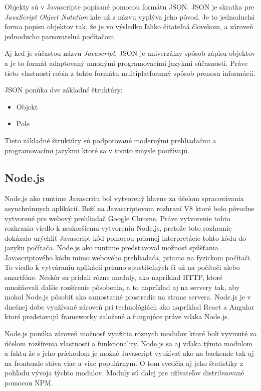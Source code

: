 Objekty sú v Javascripte popísané pomocou formátu JSON. JSON je skratka pre \textit{JavaScript Object Notation} kde už z názvu vyplýva jeho pôvod. Je to jednoduchá forma popisu objektov tak, že je vo výsledku ľahko čitateľná človekom, a zároveň jednoducho parsovatelná počítačom. \cite{JSON}

Aj keď je súčasťou názvu \textit{Javascript}, JSON je univerzálny spôsob zápisu objektov a je to formát adaptovaný mnohými programovacími jazykmi súčasnosti. Práve tieto vlastnosti robia z tohto formátu multiplatformný spôsob prenosu informácií.\cite{JSON}

\bigskip

JSON ponúka dve základné štruktúry:
\begin{itemize}
    \item {Objekt}
    \item {Pole}
\end{itemize}
Tieto základné štruktúry sú podporované modernými prehliadačmi a programovacími jazykmi ktoré sa v tomto zmysle používajú.\cite{JSON}

\subsection{Node.js}

Node.js ako runtime Javascritu bol vytvorený hlavne za účelom spracovávania asynchrónnych aplikácií. Beží na Javascriptovom rozhraní V8 ktoré bolo pôvodne vytvorené pre webový prehliadač Google Chrome. Práve vytvorenie tohto rozhrania viedlo k neskoršiemu vytvoreniu Node.js, pretože toto rozhranie dokázalo urýchliť Javascript kód pomocou priamej interpretácie tohto kódu do jazyku počítača. Node.js ako runtime predstavoval možnosť spúšťania Javascriptového kódu mimo webového prehliadača, priamo na fyzickom počítači. To viedlo k vytváraniu aplikácií priamo spustiteľných či už na počítači alebo smartfóne. Neskôr sa pridali rôzne moduly, ako napríklad HTTP, ktoré umožňovali ďalšie rozšírenie pôsobenia, a to napríklad aj na servery tak, aby mohol Node.js pôsobiť ako samostatné prostredie na strane servera. Node.js je v dnešnej dobe využívané zároveň pri technológiách ako napríklad React a Angular ktoré predstavujú frameworky založené a fungujúce práve vďaka Node.js.\cite{Node}

\bigskip

Node.js ponúka zároveň možnosť využitia rôznych modulov ktoré boli vyvinuté za účelom rozšírenia vlastností a funkcionality. Node.js sa aj vďaka týmto modulom a faktu že s jeho príchodom je možné Javascript využívať ako na backende tak aj na frontende stáva viac a viac populárnym. O tom svedčia aj jeho štatistiky z pohľadu vývoja týchto modulov. Moduly sú ďalej pre užívateľov distribuované pomocou NPM.

